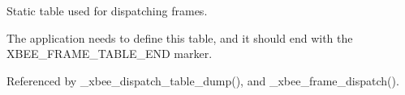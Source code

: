 Static table used for dispatching frames. 

The application needs to define this table, and it should end with the X\-B\-E\-E\-\_\-\-F\-R\-A\-M\-E\-\_\-\-T\-A\-B\-L\-E\-\_\-\-E\-N\-D marker. 

Referenced by \-\_\-xbee\-\_\-dispatch\-\_\-table\-\_\-dump(), and \-\_\-xbee\-\_\-frame\-\_\-dispatch().

